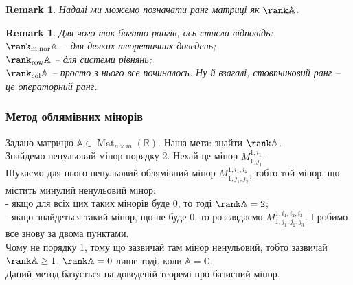 \documentclass[a4paper, 10pt]{article}
\theoremstyle{theoremdd}
\newtheorem{remark}[theorem]{Remark}
\DeclareMathOperator{\Mat}{Mat}
\begin{document}
\begin{remark}
Надалі ми можемо позначати ранг матриці як $\rank \mathbb{A}$.
\end{remark}

\begin{remark}
Для чого так багато рангів, ось стисла відповідь:\\
$\rank_{\textrm{minor}} \mathbb{A}$ -- для деяких теоретичних доведень;\\
$\rank_{\textrm{row}} \mathbb{A}$ -- для системи рівнянь;\\
$\rank_{\textrm{col}} \mathbb{A}$ -- просто з нього все починалось. Ну й взагалі, стовпчиковий ранг -- це операторний ранг.
\end{remark}

\subsubsection*{Метод облямівних мінорів}
Задано матрицю $\mathbb{A} \in \Mat_{n \times m}(\mathbb{R})$. Наша мета: знайти $\rank \mathbb{A}$.\\
Знайдемо ненульовий мінор порядку 2. Нехай це мінор $M_{1,j_1}^{1,i_1}$.\\
Шукаємо для нього ненульовий облямівний мінор $M_{1,j_1,j_2}^{1,i_1,i_2}$, тобто той мінор, що містить минулий ненульовий мінор:\\
- якщо для всіх цих таких мінорів буде 0, то тоді $\rank \mathbb{A} = 2$;\\
- якщо знайдеться такий мінор, що не буде 0, то розглядаємо $M_{1,j_1,j_2,j_3}^{1,i_1,i_2,i_3}$. І робимо все знову за двома пунктами.
\bigskip \\
Чому не порядку 1, тому що зазвичай там мінор ненульовий, тобто зазвичай $\rank \mathbb{A} \geq 1$. $\rank \mathbb{A} = 0$ лише тоді, коли $\mathbb{A} = \mathbb{O}$.
\bigskip \\
Даний метод базується на доведеній теоремі про базисний мінор.
\end{document}
